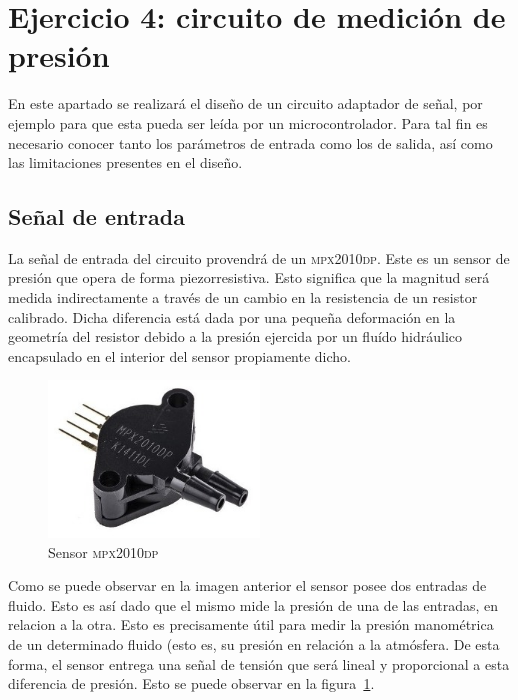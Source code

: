 \section{Ejercicio 4: circuito de medici\'on de presi\'on}
En este apartado se realizar\'a el dise\~no de un circuito adaptador de se\~nal, por ejemplo para que esta pueda ser le\'ida por un microcontrolador. Para tal fin es necesario conocer tanto los par\'ametros de entrada como los de salida, as\'i como las limitaciones presentes en el dise\~no.

\subsection{Se\~nal de entrada}
La se\~nal de entrada del circuito provendr\'a de un \textsc{mpx2010dp}. Este es un sensor de presi\'on que opera de forma piezorresistiva. Esto significa que la magnitud ser\'a medida indirectamente a trav\'es de un cambio en la resistencia de un resistor calibrado. Dicha diferencia est\'a dada por una peque\~na deformaci\'on en la geometr\'ia del resistor debido a la presi\'on ejercida por un flu\'ido hidr\'aulico encapsulado en el interior del sensor propiamente dicho.

\begin{figure}[H]
    \centering
    \includegraphics[width=0.5\textwidth]{../EJ4/resources/mpx2010dp.png}
    \caption{Sensor \textsc{mpx2010dp}}
    \label{fig:EJ4_mpx2010dp_image}
\end{figure}

Como se puede observar en la imagen anterior el sensor posee dos entradas de fluido. Esto es as\'i dado que el mismo mide la presi\'on de una de las entradas, en relacion a la otra. Esto es precisamente \'util para medir la presi\'on manom\'etrica de un determinado fluido (esto es, su presi\'on en relaci\'on a la atm\'osfera. De esta forma, el sensor entrega una se\~nal de tensi\'on que ser\'a lineal y proporcional a esta diferencia de presi\'on. Esto se puede observar en la figura~\ref{fig:EJ4_mpx2010dp_image}.

